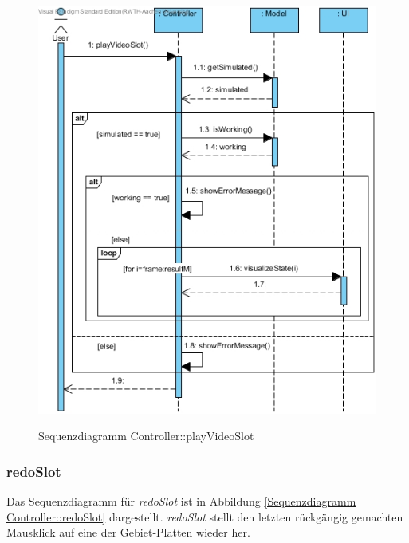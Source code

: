 \begin{figure}[H]
	\centering
	\includegraphics[scale=.55]{Bilder/Controller__playVideoSlot().jpg}\\
	\caption{Sequenzdiagramm Controller::playVideoSlot}
	\label{Sequenzdiagramm Controller::playVideoSlot}
\end{figure}

\subsubsection*{redoSlot}

Das Sequenzdiagramm für \emph{redoSlot} ist in Abbildung \ref{Sequenzdiagramm Controller::redoSlot} dargestellt. \emph{redoSlot} stellt den letzten rückgängig gemachten Mausklick auf eine der Gebiet-Platten wieder her.

